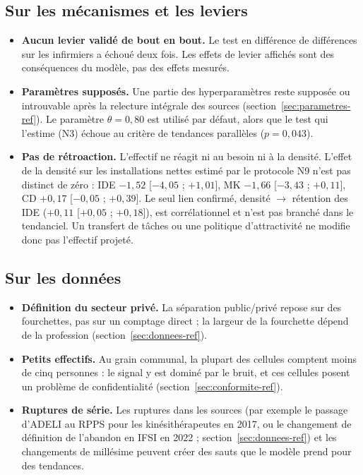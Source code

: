 \subsection{Sur les mécanismes et les leviers}
\begin{itemize}
\item \textbf{Aucun levier validé de bout en bout.} Le test en différence de différences sur les infirmiers a
  échoué deux fois. Les effets de levier affichés sont des conséquences du modèle, pas des effets mesurés.
\item \textbf{Paramètres supposés.} Une partie des hyperparamètres reste supposée ou introuvable après la relecture
  intégrale des sources (section~\ref{sec:parametres-ref}). Le paramètre $\theta = 0{,}80$ est utilisé par défaut,
  alors que le test qui l'estime (N3) échoue au critère de tendances parallèles ($p = 0{,}043$).
\item \textbf{Pas de rétroaction.} L'effectif ne réagit ni au besoin ni à la densité. L'effet de la densité sur
  les installations nettes estimé par le protocole N9 n'est pas distinct de zéro : IDE $-1{,}52$ [$-4{,}05$ ;
  $+1{,}01$]\mesure, MK $-1{,}66$ [$-3{,}43$ ; $+0{,}11$]\mesure, CD $+0{,}17$ [$-0{,}05$ ; $+0{,}39$]\mesure. Le
  seul lien confirmé, densité $\to$ rétention des IDE ($+0{,}11$ [$+0{,}05$ ; $+0{,}18$]\mesure), est
  corrélationnel et n'est pas branché dans le tendanciel. Un transfert de tâches ou une politique d'attractivité
  ne modifie donc pas l'effectif projeté.
\end{itemize}

\subsection{Sur les données}
\begin{itemize}
\item \textbf{Définition du secteur privé.} La séparation public/privé repose sur des fourchettes, pas sur un
  comptage direct ; la largeur de la fourchette dépend de la profession (section~\ref{sec:donnees-ref}).
\item \textbf{Petits effectifs.} Au grain communal, la plupart des cellules comptent moins de cinq personnes : le
  signal y est dominé par le bruit, et ces cellules posent un problème de confidentialité
  (section~\ref{sec:conformite-ref}).
\item \textbf{Ruptures de série.} Les ruptures dans les sources (par exemple le passage d'ADELI au RPPS pour les kinésithérapeutes en 2017, ou le changement de définition de
  l'abandon en IFSI en 2022 ; section~\ref{sec:donnees-ref})
  et les changements de millésime peuvent créer des sauts que le modèle prend pour des tendances.
\end{itemize}

